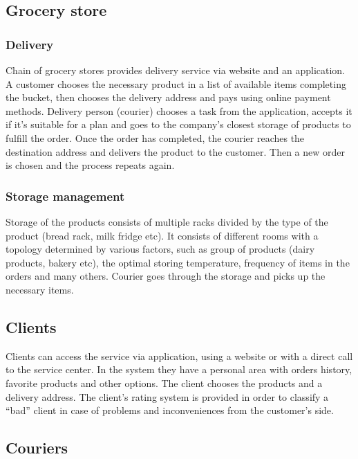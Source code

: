 \subsection{Grocery store}

\subsubsection{Delivery}

Chain of grocery stores provides delivery service via website and an application. A customer chooses the necessary product in a list of available items completing the bucket, then chooses the delivery address and pays using online payment methods. Delivery person (courier) chooses a task from the application, accepts it if it’s suitable for a plan and goes to the company’s closest storage of products to fulfill the order. Once the order has completed, the courier reaches the destination address and delivers the product to the customer. Then a new order is chosen and the process repeats again.

\subsubsection{Storage management}

Storage of the products consists of multiple racks divided by the type of the product (bread rack, milk fridge etc). It consists of different rooms with a topology determined by various factors, such as group of products (dairy products, bakery etc), the optimal storing temperature, frequency of items in the orders and many others. Courier goes through the storage and picks up the necessary items. 

\subsection{Clients}

Clients can access the service via application, using a website or with a direct call to the service center. In the system they have a personal area with orders history, favorite products and other options. The client chooses the products and a delivery address. The client’s rating system is provided in order to classify a “bad” client in case of problems and inconveniences from the customer’s side.

\subsection{Couriers}

